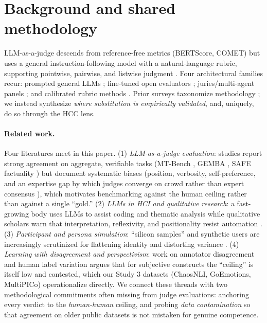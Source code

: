 \section{Background and shared methodology}
LLM-as-a-judge descends from reference-free metrics (BERTScore, COMET) but uses a general instruction-following
model with a natural-language rubric, supporting pointwise, pairwise, and listwise judgment
\citep{li2024compsurvey,gu2024survey}. Four architectural families recur: prompted general LLMs
\citep{zheng2023mtbench,liu2023geval}; fine-tuned open evaluators \citep{kim2023prometheus,zhu2023judgelm,
wang2023pandalm}; juries/multi-agent panels \citep{verga2024poll,chan2023chateval}; and calibrated rubric methods
\citep{hashemi2024llmrubric}. Prior surveys taxonomize methodology \citep{gu2024survey,li2024gen2judge}; we instead
synthesize \emph{where substitution is empirically validated}, and, uniquely, do so through the HCC lens.

\paragraph{Related work.} Four literatures meet in this paper. (1) \emph{LLM-as-a-judge evaluation}: studies report
strong agreement on aggregate, verifiable tasks (MT-Bench \citep{zheng2023mtbench}, GEMBA \citep{kocmi2023gembamqm},
SAFE factuality \citep{wei2024safe}) but document systematic biases (position, verbosity, self-preference, and an
expertise gap by which judges converge on crowd rather than expert consensus \citep{bavaresco2024judgebench}), which
motivates benchmarking against the human ceiling rather than against a single ``gold.'' (2) \emph{LLMs in HCI and
qualitative research}: a fast-growing body uses LLMs to assist coding and thematic analysis
\citep{xiao2023support,gao2024collabcoder,dai2023llminloop} while qualitative scholars warn that interpretation,
reflexivity, and positionality resist automation \citep{schroeder2025usestensions,davison2024ethics}. (3)
\emph{Participant and persona simulation}: ``silicon samples'' \citep{argyle2023outofone} and synthetic users are
increasingly scrutinized for flattening identity and distorting variance
\citep{wang2024flatten,cheng2023compost,bisbee2023perils}. (4) \emph{Learning with disagreement and perspectivism}:
work on annotator disagreement and human label variation \citep{calderon2025alttest} argues that for subjective
constructs the ``ceiling'' is itself low and contested, which our Study 3 datasets (ChaosNLI, GoEmotions, MultiPICo)
operationalize directly. We connect these threads with two methodological commitments often missing from
judge evaluations: anchoring every verdict to the \emph{human-human} ceiling, and probing \emph{data contamination}
so that agreement on older public datasets is not mistaken for genuine competence.

